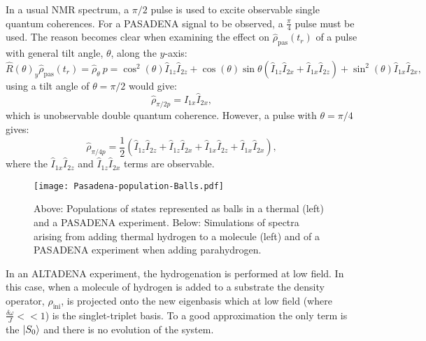  In a usual NMR spectrum, a $\pi/2$ pulse is used to excite observable single quantum coherences. For a PASADENA signal to
 be observed, a $\frac{\pi}{4}$ pulse must be used. The reason becomes clear when examining the effect on $\hat{\rho}_{\text{pas}}(t_r)$ of a pulse with general
 tilt angle, $\theta$, along the $y$-axis:
\begin{equation}
  \hat{R}(\theta)_y\hat{\rho}_{\text{pas}}(t_r) = \hat{\rho}_\theta~p = \cos^2(\theta)\hat{I}_{1z}\hat{I}_{2z} +
  \cos(\theta)\sin{\theta}(\hat{I}_{1z}\hat{I}_{2x} + \hat{I}_{1x}\hat{I}_{2z}) + \sin^2(\theta)\hat{I}_{1x}\hat{I}_{2x},
\end{equation}
using a tilt angle of $\theta = \pi/2$ would give:
\begin{equation}
  \hat{\rho}_{\pi/2p}  = \hat{I}_{1x}\hat{I}_{2x},
\end{equation}
which is unobservable double quantum coherence. However, a pulse with $\theta = \pi/4$ gives:
\begin{equation}
  \hat{\rho}_{\pi/4p} = \frac{1}{2}(\hat{I}_{1z}\hat{I}_{2z} + \hat{I}_{1z}\hat{I}_{2x} + \hat{I}_{1x}\hat{I}_{2z} + \hat{I}_{1x}\hat{I}_{2x}),
\end{equation}
where the $\hat{I}_{1x}\hat{I}_{2z}$ and $\hat{I}_{1z}\hat{I}_{2x}$ terms are observable.

 \begin{figure*}[h]
   \begin{center}
   \texttt{[image: Pasadena-population-Balls.pdf]}
   \end{center}
   \caption{Above: Populations of states represented as balls in a thermal (left) and a PASADENA experiment. Below: Simulations
   of spectra arising from adding thermal hydrogen to a molecule (left) and of a PASADENA experiment when adding parahydrogen.}
   \label{fig:PASADENA}
 \end{figure*}

 In an ALTADENA experiment, the hydrogenation is performed at low field. In this case, when a molecule of hydrogen
 is added to a substrate the density operator, $\hat{\rho}_\text{ini}$, is projected onto the new eigenbasis which
 at low field (where $\frac{\delta{\omega}}{J}<<1$) is the singlet-triplet basis. To a good approximation the only term
 is the $\ket{S_0}$ and there is no evolution of the system.

